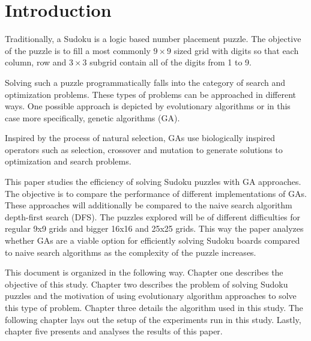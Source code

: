 \section{Introduction}
\label{sec:intro}
 
Traditionally, a Sudoku is a logic based number placement puzzle. The objective of the puzzle is to fill a most commonly $9 \times 9$ sized grid with digits so that each column, row and $3 \times 3$ subgrid contain all of the digits from 1 to 9.

Solving such a puzzle programmatically falls into the category of search and optimization problems. These types of problems can be approached in different ways. One possible approach is depicted by evolutionary algorithms or in this case more specifically, genetic algorithms (GA)\cite{WikiSudoku}.

Inspired by the process of natural selection, GAs use biologically inspired operators such as selection, crossover and mutation to generate solutions to optimization and search problems\cite{WikiGA}.

This paper studies the efficiency of solving Sudoku puzzles with GA approaches. The objective is to compare the performance of different implementations of GAs. These approaches will additionally be compared to the naive search algorithm depth-first search (DFS). The puzzles explored will be of different difficulties for regular 9x9 grids and bigger 16x16 and 25x25 grids. This way the paper analyzes whether GAs are a viable option for efficiently solving Sudoku boards compared to naive search algorithms as the complexity of the puzzle increases.

This document is organized in the following way. Chapter one describes the objective of this study. Chapter two describes the problem of solving Sudoku puzzles and the motivation of using evolutionary algorithm approaches to solve this type of problem. Chapter three details the algorithm used in this study. The following chapter lays out the setup of the experiments run in this study. Lastly, chapter five presents and analyses the results of this paper.